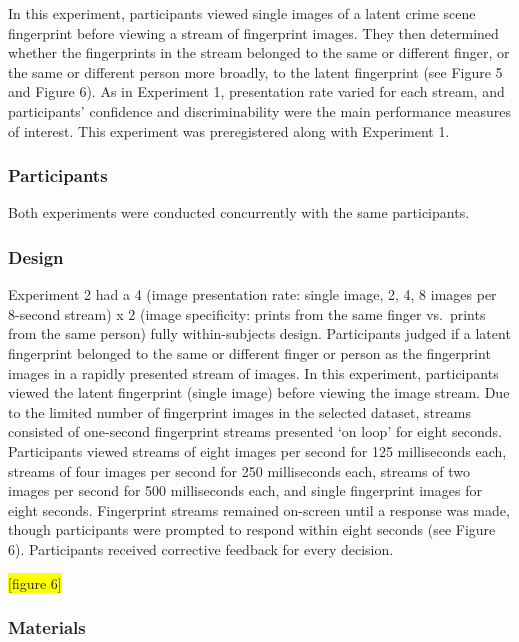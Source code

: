 \documentclass[
  english,
  man]{apa6}
\begin{document}
In this experiment, participants viewed single images of a latent crime scene fingerprint before viewing a stream of fingerprint images. They then determined whether the fingerprints in the stream belonged to the same or different finger, or the same or different person more broadly, to the latent fingerprint (see Figure 5 and Figure 6). As in Experiment 1, presentation rate varied for each stream, and participants' confidence and discriminability were the main performance measures of interest. This experiment was preregistered along with Experiment 1.

\hypertarget{participants-1}{%
\subsubsection{Participants}\label{participants-1}}

Both experiments were conducted concurrently with the same participants.

\hypertarget{design-1}{%
\subsubsection{Design}\label{design-1}}

Experiment 2 had a 4 (image presentation rate: single image, 2, 4, 8 images per 8-second stream) x 2 (image specificity: prints from the same finger vs.~prints from the same person) fully within-subjects design. Participants judged if a latent fingerprint belonged to the same or different finger or person as the fingerprint images in a rapidly presented stream of images. In this experiment, participants viewed the latent fingerprint (single image) before viewing the image stream. Due to the limited number of fingerprint images in the selected dataset, streams consisted of one-second fingerprint streams presented `on loop' for eight seconds. Participants viewed streams of eight images per second for 125 milliseconds each, streams of four images per second for 250 milliseconds each, streams of two images per second for 500 milliseconds each, and single fingerprint images for eight seconds. Fingerprint streams remained on-screen until a response was made, though participants were prompted to respond within eight seconds (see Figure 6). Participants received corrective feedback for every decision.

\colorbox{yellow}{[figure 6]}

\hypertarget{materials-1}{%
\subsubsection{Materials}\label{materials-1}}
\end{document}
